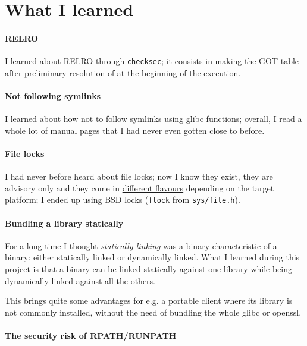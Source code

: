 
\section{What I learned}

\paragraph{RELRO}

I learned about \href{https://www.redhat.com/en/blog/hardening-elf-binaries-using-relocation-read-only-relro}
{RELRO} through \texttt{checksec}; it consists in making the GOT table after
preliminary resolution of at the beginning of the execution.

\paragraph{Not following symlinks}

I learned about how not to follow symlinks using glibc functions; overall, I read a
whole lot of manual pages that I had never even gotten close to before.

\paragraph{File locks}

I had never before heard about file locks; now I know they exist, they are advisory
only and they come in \href{https://gavv.net/articles/file-locks/}{different flavours}
depending on the target platform; I ended up using BSD locks (\texttt{flock} from
\texttt{sys/file.h}).

\paragraph{Bundling a library statically}

For a long time I thought \textit{statically linking} was a binary characteristic of
a binary: either statically linked or dynamically linked. What I learned during this
project is that a binary can be linked statically against one library while
being dynamically linked against all the others.

This brings quite some advantages for e.g. a portable client where its library is
not commonly installed, without the need of bundling the whole glibc or openssl.

\paragraph{The security risk of RPATH/RUNPATH}

